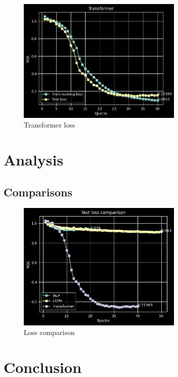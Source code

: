 \documentclass{article}
\begin{document}
\begin{figure} \label{fig:transformer_accuracy}
    \caption{Transformer loss} \center
    \includegraphics[width=0.7\textwidth]{images/2023-04-02-13-48-49.png}
\end{figure}

\section{Analysis}


\subsection{Comparisons}
\begin{figure} \label{fig:comparison}
    \caption{Loss comparison} \center
    \includegraphics[width=0.7\textwidth]{images/compare.png}
\end{figure}
\section{Conclusion}



\end{document}
